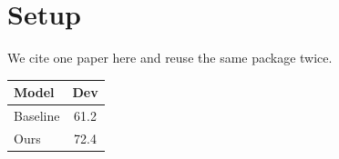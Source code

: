 \documentclass{article}
\begin{document}
\section{Setup}
\label{sec:setup}
We cite one paper here \citep{lewis2020rag} and reuse the same package twice.

\begin{table}[t]
\centering
\begin{tabular}{lc}
\toprule
Model & Dev \\
\midrule
Baseline & 61.2 \\
Ours & 72.4 \\
\bottomrule
\end{tabular}
\end{table}
\end{document}
